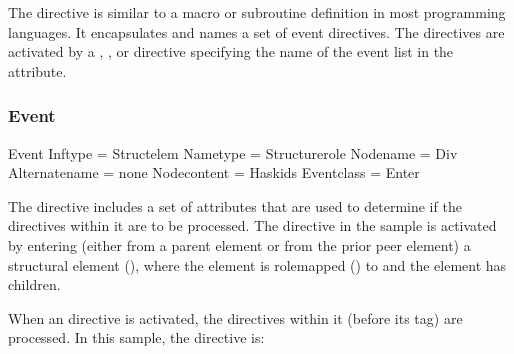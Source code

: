 \documentclass[letterpaper,12pt,english,openany,oneside]{sphinxmanual}
\begin{document}
The  directive is similar to a macro or subroutine definition in most programming languages. It encapsulates and names a set of event directives. The directives are activated by a , , or  directive specifying the name of the event list in the  attribute.


\subsubsection{Event}
\label{\detokenize{index:event}}
\begin{sphinxVerbatim}[commandchars=\\\{\}]
\PYGZlt{}Event  Inf\PYGZhy{}type = \PYGZdq{}Struct\PYGZhy{}elem\PYGZdq{} Name\PYGZhy{}type = \PYGZdq{}Structure\PYGZhy{}role\PYGZdq{}
        Node\PYGZhy{}name = \PYGZdq{}Div\PYGZdq{} Alternate\PYGZhy{}name = \PYGZdq{}\PYGZhy{}none\PYGZhy{}\PYGZdq{}
        Node\PYGZhy{}content = \PYGZdq{}Has\PYGZhy{}kids\PYGZdq{} Event\PYGZhy{}class = \PYGZdq{}Enter\PYGZdq{}\PYGZgt{}
\end{sphinxVerbatim}

The  directive includes a set of attributes that are used to determine if the directives within it are to be processed. The directive in the sample is activated by entering (either from a parent element or from the prior peer element) a structural element (), where the element is role\sphinxhyphen{}mapped () to  and the element has children.

When an  directive is activated, the directives within it (before its  tag) are processed. In this sample, the directive is:

\begin{sphinxVerbatim}[commandchars=\\\{\}]
 
\end{sphinxVerbatim}
\end{document}
